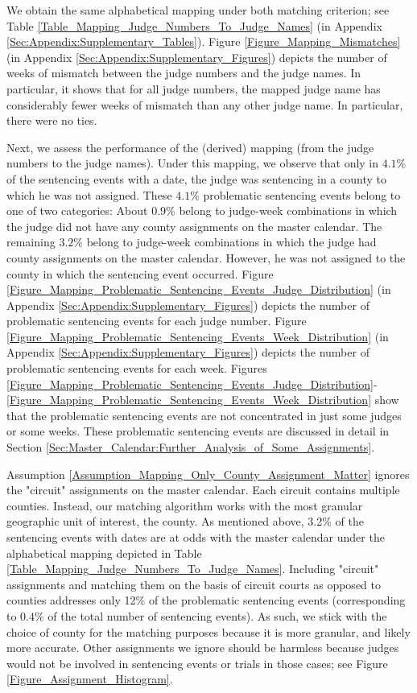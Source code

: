 \documentclass[11pt, oneside]{article}   	%
\theoremstyle{ModifiedStyle}
\begin{document}
	We obtain the same alphabetical mapping under both matching criterion; see Table \ref{Table_Mapping_Judge_Numbers_To_Judge_Names} (in Appendix \ref{Sec:Appendix:Supplementary_Tables}). Figure \ref{Figure_Mapping_Mismatches} (in Appendix \ref{Sec:Appendix:Supplementary_Figures}) depicts the number of weeks of mismatch between the judge numbers and the judge names. In particular, it shows that for all judge numbers, the mapped judge name has considerably fewer weeks of mismatch than any other judge name. In particular, there were no ties.

	Next, we assess the performance of the (derived) mapping (from the judge numbers to the judge names). Under this mapping, we observe that only in $4.1\%$ of the sentencing events with a date, the judge was sentencing in a county to which he was not assigned. These $4.1\%$ problematic sentencing events belong to one of two categories: About $0.9\%$ belong to judge-week combinations in which the judge did not have any county assignments on the master calendar. The remaining $3.2\%$ belong to judge-week combinations in which the judge had county assignments on the master calendar. However, he was not assigned to the county in which the sentencing event occurred. Figure \ref{Figure_Mapping_Problematic_Sentencing_Events_Judge_Distribution} (in Appendix \ref{Sec:Appendix:Supplementary_Figures}) depicts the number of problematic sentencing events for each judge number. Figure \ref{Figure_Mapping_Problematic_Sentencing_Events_Week_Distribution} (in Appendix \ref{Sec:Appendix:Supplementary_Figures}) depicts the number of problematic sentencing events for each week. Figures \ref{Figure_Mapping_Problematic_Sentencing_Events_Judge_Distribution}-\ref{Figure_Mapping_Problematic_Sentencing_Events_Week_Distribution} show that the problematic sentencing events are not concentrated in just some judges or some weeks. These problematic sentencing events are discussed in detail in Section \ref{Sec:Master_Calendar:Further_Analysis_of_Some_Assignments}.

	Assumption \ref{Assumption_Mapping_Only_County_Assignment_Matter} ignores the "circuit" assignments on the master calendar. Each circuit contains multiple counties. Instead, our matching algorithm works with the most granular geographic unit of interest, the county. As mentioned above, 3.2\% of the sentencing events with dates are at odds with the master calendar under the alphabetical mapping depicted in Table \ref{Table_Mapping_Judge_Numbers_To_Judge_Names}. Including "circuit" assignments and matching them on the basis of circuit courts as opposed to counties addresses only 12\% of the problematic sentencing events (corresponding to $0.4\%$ of the total number of sentencing events). As such, we stick with the choice of county for the matching purposes because it is more granular, and likely more accurate. Other assignments we ignore should be harmless because judges would not be involved in sentencing events or trials in those cases; see Figure  \ref{Figure_Assignment_Histogram}.
\end{document}

